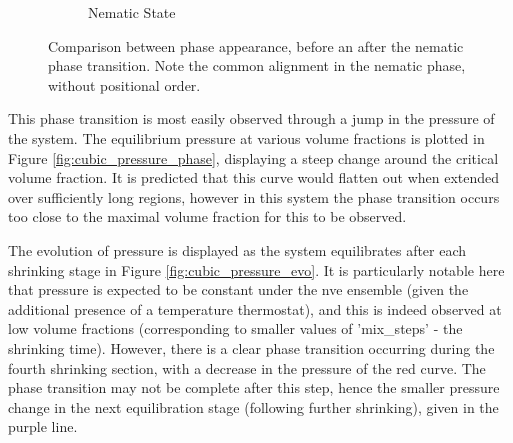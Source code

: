 \documentclass[11pt, a4paper]{article} %
\begin{document}
\begin{figure}[ht]
\begin{subfigure}{.42\textwidth}
		\caption{Nematic State}
		\label{fig:cubic_nematic}
	\end{subfigure}
	\caption{Comparison between phase appearance, before an after the nematic phase transition. Note the common alignment in the nematic phase, without positional order.}
	\label{fig:cubic_particles}
\end{figure}

This phase transition is most easily observed through a jump in the pressure of the system. The equilibrium pressure at various volume fractions is plotted in Figure \ref{fig:cubic_pressure_phase}, displaying a steep change around the critical volume fraction. It is predicted that this curve would flatten out when extended over sufficiently long regions, however in this system the phase transition occurs too close to the maximal volume fraction for this to be observed. 


The evolution of pressure is displayed as the system equilibrates after each shrinking stage in Figure \ref{fig:cubic_pressure_evo}. It is particularly notable here that pressure is expected to be constant under the nve ensemble (given the additional presence of a temperature thermostat), and this is indeed observed at low volume fractions (corresponding to smaller values of 'mix\_steps' - the shrinking time). However, there is a clear phase transition occurring during the fourth shrinking section, with a decrease in the pressure of the red curve. The phase transition may not be complete after this step, hence the smaller pressure change in the next equilibration stage (following further shrinking), given in the purple line. 
\end{document}
